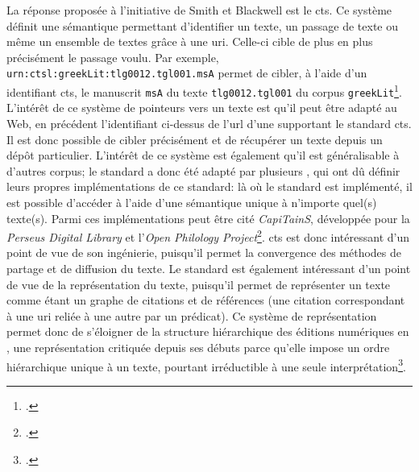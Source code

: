 La réponse proposée à l'initiative de Smith et Blackwell est le \gls{cts}. Ce système définit une sémantique permettant d'identifier un texte, un passage de texte ou même un ensemble de textes grâce à une \gls{uri}. Celle-ci cible de plus en plus précisément le passage voulu. Par exemple, \texttt{urn:ctsl:greekLit:tlg0012.tgl001.msA} permet de cibler, à l'aide d'un identifiant \gls{cts}, le manuscrit \texttt{msA} du texte \texttt{tlg0012.tgl001} du corpus \texttt{greekLit}\footcite{smith_four_2012}. L'intérêt de ce système de pointeurs vers un texte est qu'il peut être adapté au Web, en précédent l'identifiant ci-dessus de l'\gls{url} d'une \api{} supportant le standard \gls{cts}. Il est donc possible de cibler précisément et de récupérer un texte depuis un dépôt particulier. L'intérêt de ce système est également qu'il est généralisable à d'autres corpus; le standard a donc été adapté par plusieurs \api{}, qui ont dû définir leurs propres implémentations de ce standard: là où le standard est implémenté, il est possible d'accéder à l'aide d'une sémantique unique à n'importe quel(s) texte(s). Parmi ces implémentations peut être cité \textit{CapiTainS}, développée pour la \textit{Perseus Digital Library} et l'\textit{Open Philology Project}\footcite{almas_continuous_2018}. \gls{cts} est donc intéressant d'un point de vue de son ingénierie, puisqu'il permet la convergence des méthodes de partage et de diffusion du texte. Le standard est également intéressant d'un point de vue de la représentation du texte, puisqu'il permet de représenter un texte comme étant un graphe de citations et de références (une citation correspondant à une \gls{uri} reliée à une autre par un prédicat). Ce système de représentation permet donc de s'éloigner de la structure hiérarchique des éditions numériques en \tei{}, une représentation critiquée depuis ses débuts parce qu'elle impose un ordre hiérarchique unique à un texte, pourtant irréductible à une seule interprétation\footcite{renear_refining_1996}.

